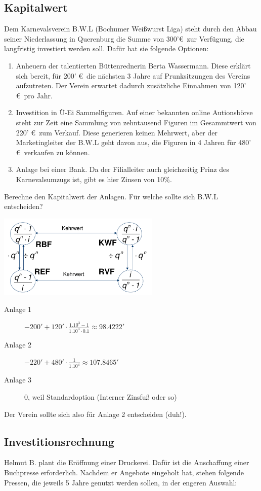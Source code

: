 \documentclass[11pt, a4paper]{article}
\begin{document}
\subsection{Kapitalwert}
Dem Karnevalsverein B.W.L (Bochumer Weißwurst Liga) steht durch den Abbau seiner Niederlassung in Querenburg die Summe von 300'\euro \ zur Verfügung, die langfristig investiert werden soll. Dafür hat sie folgende Optionen:
\begin{enumerate}
	\item Anheuern der talentierten Büttenrednerin Berta Wassermann. Diese erklärt sich bereit, für 200' \euro \ die nächsten 3 Jahre auf Prunksitzungen des Vereins aufzutreten. Der Verein erwartet dadurch zusätzliche Einnahmen von 120' \euro \ pro Jahr.
	\item Investition in Ü-Ei Sammelfiguren. Auf einer bekannten online Autionsbörse steht zur Zeit eine Sammlung von zehntausend Figuren im Gesammtwert von 220' \euro \ zum Verkauf. Diese generieren keinen Mehrwert, aber der Marketingleiter der B.W.L geht davon aus, die Figuren in 4 Jahren für 480' \euro \ verkaufen zu können.
	\item Anlage bei einer Bank. Da der Filialleiter auch gleichzeitig Prinz des Karnevalsumzugs ist, gibt es hier Zinsen von 10\%.
\end{enumerate}
Berechne den Kapitalwert der Anlagen. Für welche sollte sich B.W.L entscheiden?

\includegraphics[height=4cm]{RentenUndKapitalfaktoren.png}

\begin{description}
	\item[Anlage 1] $- 200' + 120' \cdot \frac{1.10^3 - 1}{1.10^3 \cdot 0.1} \approx 98.4222'$
	\item[Anlage 2] $- 220' + 480' \cdot \frac{1}{1.10^4} \approx 107.8465'$
	\item[Anlage 3] 0, weil Standardoption (Interner Zinsfuß oder so)
\end{description}
Der Verein sollte sich also für Anlage 2 entscheiden (duh!).

\subsection{Investitionsrechnung}
Helmut B. plant die Eröffnung einer Druckerei. Dafür ist die Anschaffung einer Buchpresse erforderlich. Nachdem er Angebote eingeholt hat, stehen folgende Pressen, die jeweils 5 Jahre genutzt werden sollen, in der engeren Auswahl:
\end{document}
